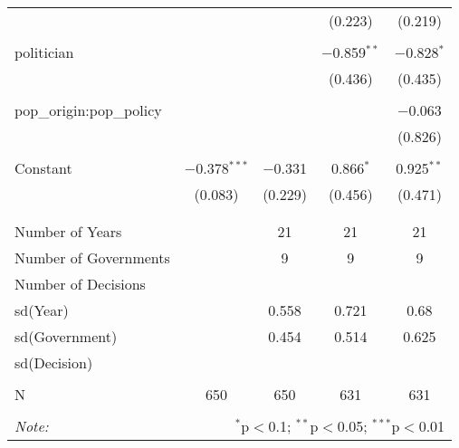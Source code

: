\begin{table}[!htbp]
\begin{tabular}{@{\extracolsep{5pt}}lcccc}
  &  &  & (0.223) & (0.219) \\ 
  & & & & \\ 
 politician &  &  & $-$0.859$^{**}$ & $-$0.828$^{*}$ \\ 
  &  &  & (0.436) & (0.435) \\ 
  & & & & \\ 
 pop\_origin:pop\_policy &  &  &  & $-$0.063 \\ 
  &  &  &  & (0.826) \\ 
  & & & & \\ 
 Constant & $-$0.378$^{***}$ & $-$0.331 & 0.866$^{*}$ & 0.925$^{**}$ \\ 
  & (0.083) & (0.229) & (0.456) & (0.471) \\ 
  & & & & \\ 
\hline \\[-1.8ex] 
Number of Years &  & 21 & 21 & 21 \\ 
Number of Governments &  & 9 & 9 & 9 \\ 
Number of Decisions &  &  &  &  \\ 
sd(Year) &  & 0.558 & 0.721 & 0.68 \\ 
sd(Government) &  & 0.454 & 0.514 & 0.625 \\ 
sd(Decision) &  &  &  &  \\ 
 &  &  &  &  \\ 
N & 650 & 650 & 631 & 631 \\ 
\hline 
\hline \\[-1.8ex] 
\textit{Note:}  & \multicolumn{4}{r}{$^{*}$p$<$0.1; $^{**}$p$<$0.05; $^{***}$p$<$0.01} \\ 
\end{tabular} 
\end{table} 
